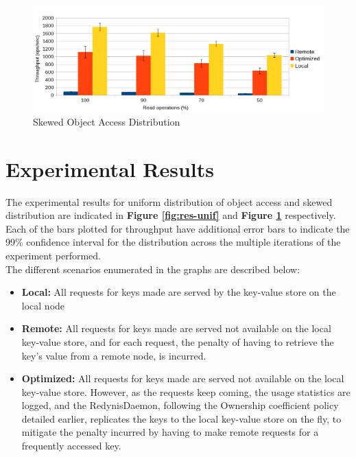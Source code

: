 \documentclass{sig-alternate}
\begin{document}
\begin{figure}[ht]
\centering
\includegraphics[width=\textwidth]{images/Uniform-dist-throughput.png}
\caption{Skewed Object Access Distribution}
\label{fig:res-skew}
\end{figure}


\section{Experimental Results}

The experimental results for uniform distribution of object access and skewed distribution are indicated in \textbf{Figure \ref{fig:res-unif}} and \textbf{Figure \ref{fig:res-skew}} respectively.\\

Each of the bars plotted for throughput have additional error bars to indicate the 99\% confidence interval for the distribution across the multiple iterations of the experiment performed. \\

The different scenarios enumerated in the graphs are described below:
\begin{itemize}
	\item \textbf{Local:} All requests for keys made are served by the key-value store on the local node
	\item \textbf{Remote:} All requests for keys made are served not available on the local key-value store, and for each request, the penalty of having to retrieve the key's value from a remote node, is incurred.
	\item \textbf{Optimized:} All requests for keys made are served not available on the local key-value store. However, as the requests keep coming, the usage statistics are logged, and the RedynisDaemon, following the Ownership coefficient policy detailed earlier, replicates the keys to the local key-value store on the fly, to mitigate the penalty incurred by having to make remote requests for a frequently accessed key.
\end{itemize}
\end{document}
